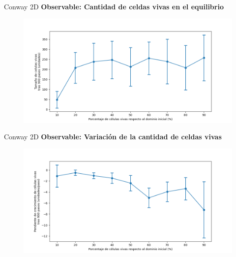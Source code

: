 \begin{frame}{Conway 2D}
    \textbf{Observable: Cantidad de celdas vivas en el equilibrio}
    \begin{figure}[H]
        \centering
        \includegraphics[width=0.8\linewidth]{pic/conway2d/size_vs_input}
        \label{fig:conway2d:size:density}
    \end{figure}
\end{frame}

\begin{frame}{Conway 2D}
    \textbf{Observable: Variación de la cantidad de celdas vivas}
    \begin{figure}[H]
        \centering
        \includegraphics[width=0.8\linewidth]{pic/conway2d/size_slope_vs_input}
        \label{fig:conway2d:size_slope:density}
    \end{figure}
\end{frame}

